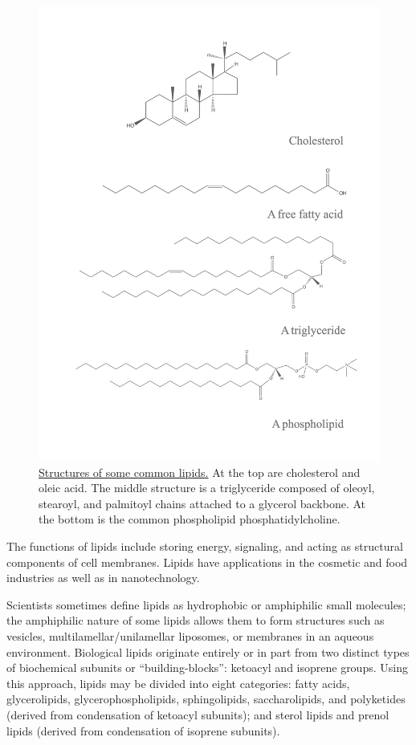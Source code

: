 \begin{figure}

{\centering \includegraphics[width=0.7\linewidth]{./figures/chemistry/Lipids} 

}

\caption{\href{https://commons.wikimedia.org/wiki/File:Common_lipids_lmaps.png}{Structures of some common lipids.} At the top are cholesterol and oleic acid. The middle structure is a triglyceride composed of oleoyl, stearoyl, and palmitoyl chains attached to a glycerol backbone. At the bottom is the common phospholipid phosphatidylcholine.}\label{fig:commonlipids}
\end{figure}

The functions of lipids include storing energy, signaling, and acting as structural components of cell membranes. Lipids have applications in the cosmetic and food industries as well as in nanotechnology.

Scientists sometimes define lipids as hydrophobic or amphiphilic small molecules; the amphiphilic nature of some lipids allows them to form structures such as vesicles, multilamellar/unilamellar liposomes, or membranes in an aqueous environment. Biological lipids originate entirely or in part from two distinct types of biochemical subunits or ``building-blocks'': ketoacyl and isoprene groups. Using this approach, lipids may be divided into eight categories: fatty acids, glycerolipids, glycerophospholipids, sphingolipids, saccharolipids, and polyketides (derived from condensation of ketoacyl subunits); and sterol lipids and prenol lipids (derived from condensation of isoprene subunits).

